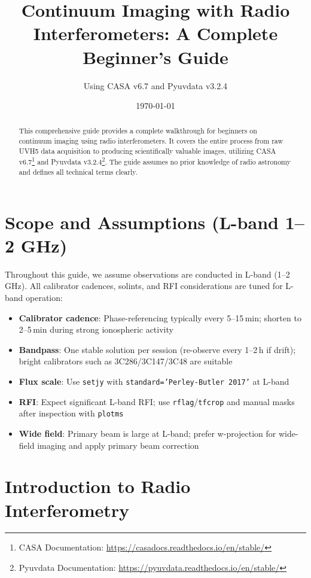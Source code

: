 \documentclass[11pt]{article}
\title{Continuum Imaging with Radio Interferometers: A Complete Beginner's Guide}
\author{Using CASA v6.7 and Pyuvdata v3.2.4}
\date{\today}
\begin{document}
\maketitle

\begin{abstract}
This comprehensive guide provides a complete walkthrough for beginners on continuum imaging using radio interferometers. It covers the entire process from raw UVH5 data acquisition to producing scientifically valuable images, utilizing CASA v6.7\footnote{CASA Documentation: \url{https://casadocs.readthedocs.io/en/stable/}} and Pyuvdata v3.2.4\footnote{Pyuvdata Documentation: \url{https://pyuvdata.readthedocs.io/en/stable/}}. The guide assumes no prior knowledge of radio astronomy and defines all technical terms clearly.
\end{abstract}

\tableofcontents
\newpage

\section{Scope and Assumptions (L-band 1--2 GHz)}
Throughout this guide, we assume observations are conducted in L-band (1--2\,GHz). All calibrator cadences, solints, and RFI considerations are tuned for L-band operation:
\begin{itemize}
    \item \textbf{Calibrator cadence}: Phase-referencing typically every 5--15\,min; shorten to 2--5\,min during strong ionospheric activity
    \item \textbf{Bandpass}: One stable solution per session (re-observe every 1--2\,h if drift); bright calibrators such as 3C286/3C147/3C48 are suitable
    \item \textbf{Flux scale}: Use \texttt{setjy} with \texttt{standard='Perley-Butler 2017'} at L-band
    \item \textbf{RFI}: Expect significant L-band RFI; use \texttt{rflag}/\texttt{tfcrop} and manual masks after inspection with \texttt{plotms}
    \item \textbf{Wide field}: Primary beam is large at L-band; prefer w-projection for wide-field imaging and apply primary beam correction
\end{itemize}

\section{Introduction to Radio Interferometry}
\end{document}
